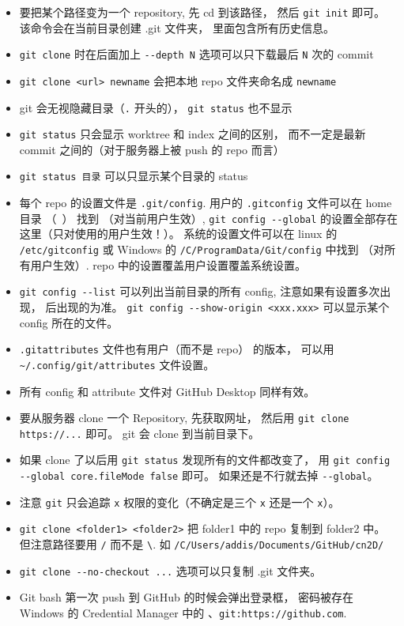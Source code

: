 \begin{itemize}
\item 要把某个路径变为一个 repository, 先 cd 到该路径， 然后 \verb`git init` 即可。 该命令会在当前目录创建 .git 文件夹， 里面包含所有历史信息。
\item \verb`git clone` 时在后面加上 \verb`--depth N` 选项可以只下载最后 \verb`N` 次的 commit
\item \verb`git clone <url> newname` 会把本地 repo 文件夹命名成 \verb`newname`
\item git 会无视隐藏目录（\verb`.` 开头的）， \verb`git status` 也不显示
\item \verb`git status` 只会显示 worktree 和 index 之间的区别， 而不一定是最新 commit 之间的（对于服务器上被 push 的 repo 而言）
\item \verb`git status 目录` 可以只显示某个目录的 status
\item 每个 repo 的设置文件是 \verb`.git/config`. 用户的 \verb`.gitconfig` 文件可以在 home 目录 （~） 找到 （对当前用户生效）, \verb`git config --global` 的设置全部存在这里（只对使用的用户生效！）。 系统的设置文件可以在 linux 的 \verb`/etc/gitconfig` 或 Windows 的 \verb`/C/ProgramData/Git/config` 中找到 （对所有用户生效）. repo 中的设置覆盖用户设置覆盖系统设置。
\item \verb`git config --list` 可以列出当前目录的所有 config, 注意如果有设置多次出现， 后出现的为准。 \verb`git config --show-origin <xxx.xxx>` 可以显示某个 config 所在的文件。
\item \verb`.gitattributes` 文件也有用户（而不是 repo） 的版本， 可以用 \verb`~/.config/git/attributes` 文件设置。
\item 所有 config 和 attribute 文件对 GitHub Desktop 同样有效。
\item 要从服务器 clone 一个 Repository, 先获取网址， 然后用 \verb`git clone https://...` 即可。 git 会 clone 到当前目录下。
\item 如果 clone 了以后用 \verb`git status` 发现所有的文件都改变了， 用 \verb`git config --global core.fileMode false` 即可。 如果还是不行就去掉 \verb`--global`。
\item 注意 \verb`git` 只会追踪 \verb`x` 权限的变化（不确定是三个 \verb`x` 还是一个 \verb`x`）。
\item \verb`git clone <folder1> <folder2>` 把 folder1 中的 repo 复制到 folder2 中。 但注意路径要用 \verb`/` 而不是 \verb`\`. 如 \verb`/C/Users/addis/Documents/GitHub/cn2D/`
\item \verb`git clone --no-checkout ...` 选项可以只复制 .git 文件夹。
\item Git bash 第一次 push 到 GitHub 的时候会弹出登录框， 密码被存在 Windows 的 Credential Manager 中的 、\verb`git:https://github.com`.

\end{itemize}
